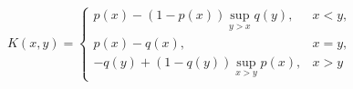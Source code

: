 \documentclass[10pt]{article}
\begin{document}
\[

K(x, y)= \begin{cases}p(x)-(1-p(x)) \sup _{y>x} q(y), & x<y, \\ p(x)-q(x), & x=y, \\ -q(y)+(1-q(y)) \sup _{x>y} p(x), & x>y\end{cases}

\]
\end{document}
